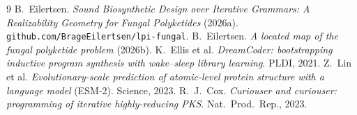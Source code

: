 \documentclass[11pt]{article}
\theoremstyle{plain}
\theoremstyle{definition}
\begin{document}
\begin{thebibliography}{9}
 B.~Eilertsen. \emph{Sound Biosynthetic Design over Iterative Grammars: A Realizability Geometry for Fungal Polyketides} (2026a). \texttt{github.com/BrageEilertsen/lpi-fungal}.
 B.~Eilertsen. \emph{A located map of the fungal polyketide problem} (2026b).
 K.~Ellis et al. \emph{DreamCoder: bootstrapping inductive program synthesis with wake--sleep library learning}. PLDI, 2021.
 Z.~Lin et al. \emph{Evolutionary-scale prediction of atomic-level protein structure with a language model} (ESM-2). Science, 2023.
 R.~J.~Cox. \emph{Curiouser and curiouser: programming of iterative highly-reducing PKS}. Nat.\ Prod.\ Rep., 2023.
\end{thebibliography}
\end{document}
